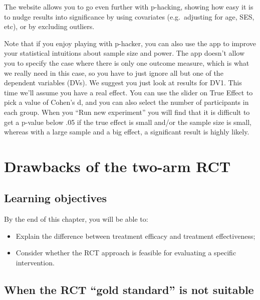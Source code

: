 \documentclass{krantz}
\begin{document}
The website allows you to go even further with p-hacking, showing how easy it is to nudge results into significance by using covariates (e.g.~adjusting for age, SES, etc), or by excluding outliers.

Note that if you enjoy playing with p-hacker, you can also use the app to improve your statistical intuitions about sample size and power. The app doesn't allow you to specify the case where there is only one outcome measure, which is what we really need in this case, so you have to just ignore all but one of the dependent variables (DVs). We suggest you just look at results for DV1. This time we'll assume you have a real effect. You can use the slider on True Effect to pick a value of Cohen's d, and you can also select the number of participants in each group. When you ``Run new experiment'' you will find that it is difficult to get a p-value below .05 if the true effect is small and/or the sample size is small, whereas with a large sample and a big effect, a significant result is highly likely.

\hypertarget{drawbacks}{%
\chapter{Drawbacks of the two-arm RCT}\label{drawbacks}}

\hypertarget{learning-objectives-13}{%
\section{Learning objectives}\label{learning-objectives-13}}

By the end of this chapter, you will be able to:

\begin{itemize}
\item
  Explain the difference between treatment efficacy and treatment effectiveness;
\item
  Consider whether the RCT approach is feasible for evaluating a specific intervention.
\end{itemize}

\hypertarget{when-the-rct-gold-standard-is-not-suitable}{%
\section{When the RCT ``gold standard'' is not suitable}\label{when-the-rct-gold-standard-is-not-suitable}}
\end{document}
